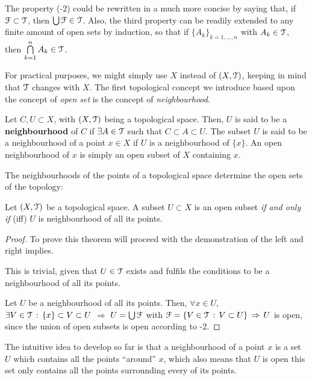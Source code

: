 \documentclass[12pt,spanish]{memoir}
\begin{document}
\begin{remark}
The property (-2) could be rewritten in a much more concise by saying that, if $\EuScript{F}\subset\EuScript{T}$, then $\bigcup\EuScript{F}\in\EuScript{T}$.
Also, the third property can be readily extended to any finite amount of open sets by induction, so that if $\{A_k\}_{k=1,\dots,n}$ with $A_k\in\EuScript{T}$, then $\bigcap\limits_{k=1}^nA_k\in \EuScript{T}$.
\end{remark}

For practical purposes, we might simply use $X$ instead of $(X, \EuScript{T})$, keeping in mind that $\EuScript{T}$ changes with $X$. 
%
The first topological concept we introduce based upon the concept of \emph{open set} is the concept of \emph{neighbourhood}.

\begin{definition}
Let $C, U\subset X$, with $(X, \EuScript{T})$ being a topological space. Then, $U$ is said to be a \textbf{neighbourhood} of $C$ if $\exists A\in\EuScript{T}$ such that $C\subset A \subset U$. The subset $U$ is said to be a neighbourhood of a point $x\in X$ if $U$ is a neighbourhood of $\{x\}$. An open neighbourhood of $x$ is simply an open subset of $X$ containing $x$. 
\label{def:neighbourhood}
\end{definition}

The neighbourhoods of the points of a topological space determine the open sets of the topology:

\begin{theorem}
Let $(X, \EuScript{T})$ be a topological space. A subset $U\subset X$ is an open subset \emph{if and only if} (iff) $U$ is neighbourhood of all its points.
\end{theorem}
\begin{proof} To prove this theorem will proceed with the demonstration of the left and right implies.

\noindent{$\boxed{\Rightarrow}$} This is trivial, given that $U\in\EuScript{T}$ exists and fulfils the conditions to be a neighbourhood of all its points.

\noindent{$\boxed{\Leftarrow}$} Let $U$ be a neighbourhood of all its points. Then, $\forall x\in U$, $\exists V\in \EuScript{T}\,:\,\{x\}\subset V\subset U$ $\Rightarrow$ $U = \bigcup\EuScript{F}$ with $\EuScript{F}=\{V\in\EuScript{T}\,:\,V\subset U\}\,\Rightarrow\,U$ is open, since the union of open subsets is open according to -2.
\end{proof}

The intuitive idea to develop so far is that a neighbourhood of a point $x$ is a set $U$ which contains all the points ``around'' $x$, which also means that $U$ is open \iff this set only contains all the points surrounding every of its points.
\end{document}
